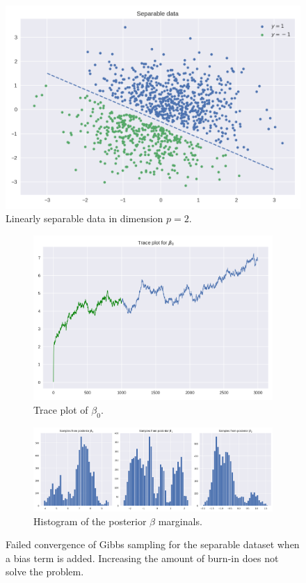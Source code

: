 \documentclass[11pt]{article}
\begin{document}
\begin{figure}[h]
	\centering
	\includegraphics[width=.66\linewidth]{images/separable_data.png}
	\caption{Linearly separable data in dimension $p=2$.}\label{fig:CompleteSeparDataset}
\end{figure}

\begin{figure}
	\centering
	\begin{subfigure}[t]{.66\linewidth}
	\includegraphics[width=\linewidth]{images/separable_traceplot_fail.png}
	\caption{Trace plot of $\beta_0$.}	
	\end{subfigure}
	\begin{subfigure}[t]{.66\linewidth}
	\includegraphics[width=\linewidth]{images/separable_fail_posteriorhist.png}
	\caption{Histogram of the posterior $\beta$ marginals.}	
	\end{subfigure}
	\caption{Failed convergence of Gibbs sampling for the separable dataset when a bias term is added. Increasing the amount of burn-in does not solve the problem.}\label{fig:CompleteSeparFailedConv}
\end{figure}
\end{document}
